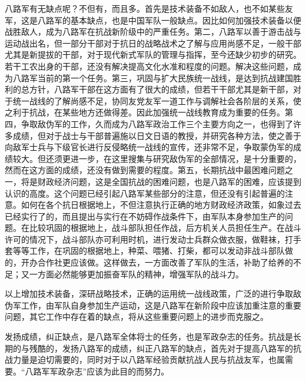 八路军有无缺点呢？不但有，而且多。首先是技术装备不如敌人，也不如某些友军，这是八路军的基本缺点，也是中国军队一般缺点。因比如何加强技术装备以便战胜敌人，成为八路军在抗战新阶级中的严重任务。第二，八路军以善于游击战与运动战出名，但一部分干部对于抗日的战略战术之了解与应用尚感不足，一般干部尤其是新提拔的干部，对于现代新式军队的管理与指挥，至今还缺少初步的研究。若干工农出身的干部，还没有解决提高文化水准和程度的问题。解决这些问题，成为八路军当前的第一个任务。第三，巩固与扩大民族统一战线，是达到抗战建国胜利的总方针，八路军干部在这方面有了很大的成绩，但若干干部尤其是新干部，对于统一战线的了解尚感不足，协同友党友军一道工作与调解社会各阶层的关系，使之利于抗战，在某些地方还做得差。因此加强统一战线教育成为重要的任务。第四，争取敌伪军的工作，久而成为八路军政治工作三个主要方向之一，也得到了许多成绩，但对于战士与干部普遍施以日文日语的教授，并研究各种方法，使之善于向敌军士兵与下级官长进行反侵略统一战线的宣传，还非常不足，争取蒙伪军的成绩较大。但还须更进一步，在这里搜集与研究敌伪军的全部情况，是十分重要的，然而在这方面的成绩，还没有做到需要的程度。第五，长期抗战中最困难问题之一，将是财政经济问题，这是全国抗战的困难问题，也是八路军的困难，应该提到认识的高度。这个问题已经引起八路军某些部分的注意，但还没有引起普遍的注意。如何在各个抗日根据地上，不但注意执行正确的地方财政经济政策，如象过去已经实行了的，而且提出与实行在不妨碍作战条件下，由军队本身参加生产的问题。在比较巩固的根据地上，战斗部队担任作战，后方机关人员担任生产。在战斗许可的情况下，战斗部队亦可利用时机，进行发动士兵群众做衣服，做鞋袜，打手套等等工作，在巩固的根据地上，种菜、喂猪、打柴，都可以发动非战斗部队做的，开办合作社更应该做。这样做去，一方面改善了军队的生活，补助了给养的不足；又一方面必然能够更加振奋军队的精神，增强军队的战斗力。

以上增加技术装备，深研战略技术，正确的运用统一战线政策，广泛的进行争取敌伪军工作，由军队自身参加生产运动，这是八路军在新阶段中应该加重注意的重要问题，其它工作中存在着的缺点，将从这些重要问题上的进步而克服之。

发扬成绩，纠正缺点，是八路军全体将士的任务，也是军政杂志的任务。抗战是长期的与残酷的，发扬八路军的成绩，纠正八路军的缺点，首先对于提高八路军的抗战力量是迫切需要的，同时对于以八路军经验贡献抗战人民与抗战友军，也属需要。“八路军军政杂志”应该为此目的而努力。

